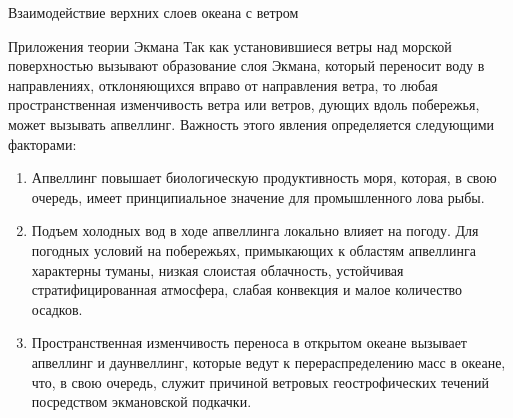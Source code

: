 \begin{chapter}{Взаимодействие верхних слоев океана с ветром}
\begin{section}{Приложения теории Экмана}
Так как установившиеся ветры над морской поверхностью вызывают образование
слоя Экмана, который переносит воду
в направлениях, отклоняющихся вправо от направления ветра, то любая
пространственная изменчивость ветра или ветров, дующих вдоль побережья,
может вызывать апвеллинг. 
Важность этого явления определяется следующими
факторами:
%
%
\begin{enumerate}
\item 
Апвеллинг повышает биологическую продуктивность моря, которая, в свою
очередь, имеет принципиальное значение для промышленного лова рыбы.
%

\item 
Подъем холодных вод в ходе апвеллинга локально влияет на погоду. Для погодных
условий на побережьях, примыкающих к областям 
апвеллинга характерны туманы, 
низкая слоистая облачность, устойчивая стратифицированная атмосфера, слабая
конвекция и малое количество осадков.
%

\item 
Пространственная изменчивость переноса в открытом океане вызывает 
апвеллинг и даунвеллинг, 
которые ведут к перераспределению масс в океане, что, в свою очередь,
служит причиной ветровых геострофических 
течений посредством
экмановской подкачки.
%
\end{enumerate}


\end{section}
\end{chapter}
